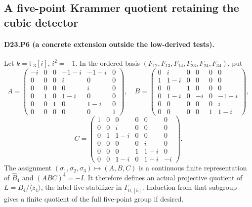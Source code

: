 \subsection{A five-point Krammer quotient retaining the cubic detector}

\paragraph{D23.P6 (a concrete extension outside the low-derived tests).}
Let $k=\mathbb F_3[i]$, $i^2=-1$. In the ordered basis
$(F_{12},F_{13},F_{14},F_{23},F_{24},F_{34})$, put
\[
A=\begin{pmatrix}
-i&0&0&-1-i&-1-i&0\\
0&0&0&i&0&0\\
0&0&0&0&i&0\\
0&1&0&1-i&0&0\\
0&0&1&0&1-i&0\\
0&0&0&0&0&1
\end{pmatrix},\quad
B=\begin{pmatrix}
0&i&0&0&0&0\\
1&1-i&0&0&0&0\\
0&0&1&0&0&0\\
0&1-i&0&-i&0&-1-i\\
0&0&0&0&0&i\\
0&0&0&0&1&1-i
\end{pmatrix},
\]
\[
C=\begin{pmatrix}
1&0&0&0&0&0\\
0&0&i&0&0&0\\
0&1&1-i&0&0&0\\
0&0&0&0&i&0\\
0&0&0&1&1-i&0\\
0&0&1-i&0&1-i&-i
\end{pmatrix}.
\tag{D23.P6.1}
\]
The assignment $(\sigma_1,\sigma_2,\sigma_3)\mapsto(A,B,C)$
is a continuous finite representation of $\widehat B_4$ and
$(ABC)^4=-I$. It therefore defines an actual projective quotient
of $L=B_4/\langle z_4\rangle$, the label-five stabilizer in
$\Gamma_{0,[5]}$. Induction from that subgroup gives a finite
quotient of the full five-point group if desired.

